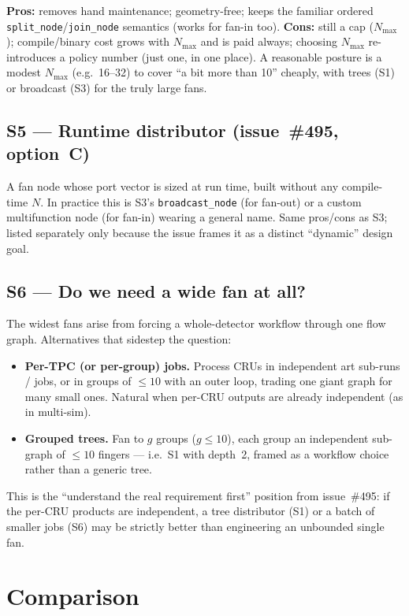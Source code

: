 \documentclass[11pt]{article}
\newcommand{\code}[1]{\texttt{#1}}
\begin{document}
\textbf{Pros:} removes hand maintenance; geometry-free; keeps the familiar
ordered \code{split\_node}/\code{join\_node} semantics (works for fan-in too).
\textbf{Cons:} still a cap ($N_{\max}$); compile/binary cost grows with
$N_{\max}$ and is paid always; choosing $N_{\max}$ re-introduces a policy number
(just one, in one place).  A reasonable posture is a modest $N_{\max}$ (e.g.\
16--32) to cover ``a bit more than 10'' cheaply, with trees (S1) or broadcast
(S3) for the truly large fans.

\subsection{S5 --- Runtime distributor (issue~\#495, option~C)}

A fan node whose port vector is sized at run time, built without any
compile-time $N$.  In practice this is S3's \code{broadcast\_node} (for fan-out)
or a custom multifunction node (for fan-in) wearing a general name.  Same
pros/cons as S3; listed separately only because the issue frames it as a distinct
``dynamic'' design goal.

\subsection{S6 --- Do we need a wide fan at all?}

The widest fans arise from forcing a whole-detector workflow through one flow
graph.  Alternatives that sidestep the question:
\begin{itemize}
\item \textbf{Per-TPC (or per-group) jobs.}  Process CRUs in independent art
  sub-runs / jobs, or in groups of $\le 10$ with an outer loop, trading one giant
  graph for many small ones.  Natural when per-CRU outputs are already
  independent (as in multi-sim).
\item \textbf{Grouped trees.}  Fan to $g$ groups ($g\le10$), each group an
  independent sub-graph of $\le 10$ fingers --- i.e.\ S1 with depth~2, framed as
  a workflow choice rather than a generic tree.
\end{itemize}
\noindent
This is the ``understand the real requirement first'' position from
issue~\#495: if the per-CRU products are independent, a tree distributor (S1) or
a batch of smaller jobs (S6) may be strictly better than engineering an
unbounded single fan.

\section{Comparison}
\end{document}
